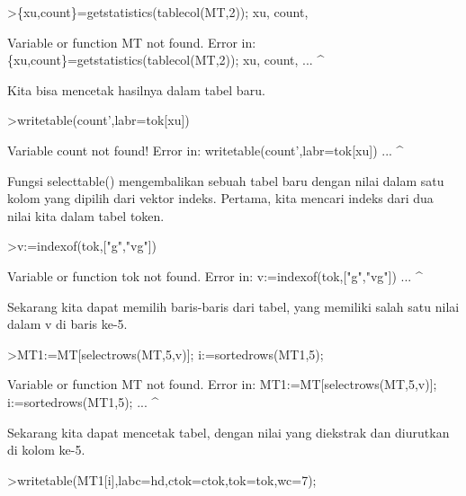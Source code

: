 \documentclass[a4paper,10pt]{article}
\begin{document}
\begin{eulernotebook}
\begin{eulercomment}
\begin{eulercomment}
\begin{eulercomment}
\begin{eulercomment}
\begin{eulercomment}
\begin{eulercomment}
\begin{eulercomment}
\begin{eulercomment}
\begin{eulercomment}
\begin{eulercomment}
\begin{eulercomment}
\begin{eulercomment}
\begin{eulercomment}
\begin{eulercomment}
\begin{eulercomment}
\begin{eulercomment}
\begin{eulercomment}
\begin{eulercomment}
\begin{eulerprompt}
>\{xu,count\}=getstatistics(tablecol(MT,2)); xu, count,
\end{eulerprompt}
\begin{euleroutput}
  Variable or function MT not found.
  Error in:
  \{xu,count\}=getstatistics(tablecol(MT,2)); xu, count, ...
                                      ^
\end{euleroutput}
\begin{eulercomment}
Kita bisa mencetak hasilnya dalam tabel baru.
\end{eulercomment}
\begin{eulerprompt}
>writetable(count',labr=tok[xu])
\end{eulerprompt}
\begin{euleroutput}
  Variable count not found!
  Error in:
  writetable(count',labr=tok[xu]) ...
                   ^
\end{euleroutput}
\begin{eulercomment}
Fungsi selecttable() mengembalikan sebuah tabel baru dengan nilai
dalam satu kolom yang dipilih dari vektor indeks. Pertama, kita
mencari indeks dari dua nilai kita dalam tabel token.
\end{eulercomment}
\begin{eulerprompt}
>v:=indexof(tok,["g","vg"])
\end{eulerprompt}
\begin{euleroutput}
  Variable or function tok not found.
  Error in:
  v:=indexof(tok,["g","vg"]) ...
                ^
\end{euleroutput}
\begin{eulercomment}
Sekarang kita dapat memilih baris-baris dari tabel, yang memiliki
salah satu nilai dalam v di baris ke-5.
\end{eulercomment}
\begin{eulerprompt}
>MT1:=MT[selectrows(MT,5,v)]; i:=sortedrows(MT1,5);
\end{eulerprompt}
\begin{euleroutput}
  Variable or function MT not found.
  Error in:
  MT1:=MT[selectrows(MT,5,v)]; i:=sortedrows(MT1,5); ...
                       ^
\end{euleroutput}
\begin{eulercomment}
Sekarang kita dapat mencetak tabel, dengan nilai yang diekstrak dan
diurutkan di kolom ke-5.
\end{eulercomment}
\begin{eulerprompt}
>writetable(MT1[i],labc=hd,ctok=ctok,tok=tok,wc=7);

\end{eulerprompt}
\end{eulercomment}
\end{eulercomment}
\end{eulercomment}
\end{eulercomment}
\end{eulercomment}
\end{eulercomment}
\end{eulercomment}
\end{eulercomment}
\end{eulercomment}
\end{eulercomment}
\end{eulercomment}
\end{eulercomment}
\end{eulercomment}
\end{eulercomment}
\end{eulercomment}
\end{eulercomment}
\end{eulercomment}
\end{eulercomment}
\end{eulernotebook}
\end{document}
